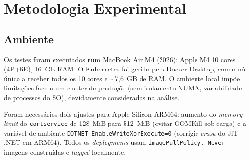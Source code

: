 \documentclass[acmsmall,screen=true,nonacm]{acmart}
\begin{document}
\begin{table}[h]
\caption{Hipóteses formuladas, cenários de teste e estado após experimentação.}
\label{tab:hipoteses}
\end{table}

\section{Metodologia Experimental}
\label{sec:metodologia}

\subsection{Ambiente}

Os testes foram executados num MacBook Air M4 (2026): Apple M4 10 cores (4P+6E), 16~GB RAM. O Kubernetes foi gerido pelo Docker Desktop, com o nó único a receber todos os 10 cores e $\sim$7,6~GB de RAM. O ambiente local impõe limitações face a um cluster de produção (sem isolamento NUMA, variabilidade de processos do SO), devidamente consideradas na análise.

Foram necessários dois ajustes para Apple Silicon ARM64: aumento do \textit{memory limit} do \texttt{cartservice} de 128~MiB para 512~MiB (evitar OOMKill sob carga) e a variável de ambiente \texttt{DOTNET\_EnableWriteXorExecute=0} (corrigir \textit{crash} do JIT .NET em ARM64). Todos os \textit{deployments} usam \texttt{imagePullPolicy: Never} — imagens construídas e \textit{tagged} localmente.
\end{document}
